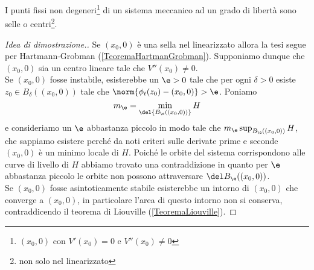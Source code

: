 \begin{proposition}\label{CaratterizzazionePuntiFissiSistemaMeccanico1GradoLiberta}
I punti fissi non degeneri\footnote{$(x_0,0)$ con $V'(x_0)=0$ e $V''(x_0)\neq 0$} di un sistema meccanico ad un grado di libert\`a sono selle o centri\footnote{non solo nel linearizzato}.
\end{proposition}
\begin{proof}[Idea di dimostrazione.]
Se $(x_0,0)$ \`e una sella nel linearizzato allora la tesi segue per Hartmann-Grobman (\ref{TeoremaHartmanGrobman}). Supponiamo dunque che $(x_0,0)$ sia un centro lineare tale che $V''(x_0)\neq 0$.\\
Se $(x_0,0)$ fosse instabile, esisterebbe un $\e>0$ tale che per ogni $\delta>0$ esiste $z_0\in B_\delta((x_0,0))$ tale che $\norm{\phi_t(z_0)-(x_0,0)}>\e$. Poniamo
\[m_\e=\min_{\del{B_\e((x_0,0))}} H\]
e consideriamo un $\e$ abbastanza piccolo in modo tale che $m_\e\sup_{B_\e((x_0,0))} H$, che sappiamo esistere perch\'e da noti criteri sulle derivate prime e seconde $(x_0,0)$ \`e un minimo locale di $H$.
Poich\'e le orbite del sistema corrispondono alle curve di livello di $H$ abbiamo trovato una contraddizione in quanto per $\e$ abbastanza piccolo le orbite non possono attraversare $\del B_\e((x_0,0))$.\\
Se $(x_0,0)$ fosse asintoticamente stabile esisterebbe un intorno di $(x_0,0)$ che converge a $(x_0,0)$, in particolare l'area di questo intorno non si conserva, contraddicendo il teorema di Liouville (\ref{TeoremaLiouville}).
\end{proof}
